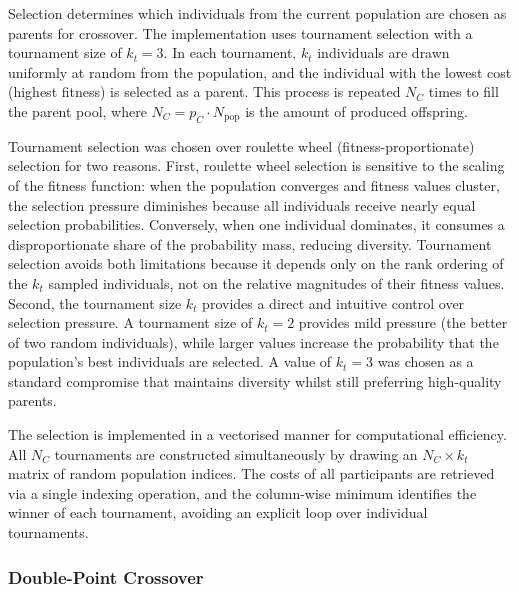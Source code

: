 Selection determines which individuals from the current population are chosen as parents for crossover. The implementation uses tournament selection with a tournament size of $k_t = 3$. In each tournament, $k_t$ individuals are drawn uniformly at random from the population, and the individual with the lowest cost (highest fitness) is selected as a parent. This process is repeated $N_C$ times to fill the parent pool, where $N_C = p_C \cdot N_{\text{pop}}$ is the amount of produced offspring.

Tournament selection was chosen over roulette wheel (fitness-proportionate) selection for two reasons. First, roulette wheel selection is sensitive to the scaling of the fitness function: when the population converges and fitness values cluster, the selection pressure diminishes because all individuals receive nearly equal selection probabilities. Conversely, when one individual dominates, it consumes a disproportionate share of the probability mass, reducing diversity. Tournament selection avoids both limitations because it depends only on the rank ordering of the $k_t$ sampled individuals, not on the relative magnitudes of their fitness values. Second, the tournament size $k_t$ provides a direct and intuitive control over selection pressure. A tournament size of $k_t = 2$ provides mild pressure (the better of two random individuals), while larger values increase the probability that the population's best individuals are selected. A value of $k_t = 3$ was chosen as a standard compromise that maintains diversity whilst still preferring high-quality parents.

The selection is implemented in a vectorised manner for computational efficiency. All $N_C$ tournaments are constructed simultaneously by drawing an $N_C \times k_t$ matrix of random population indices. The costs of all participants are retrieved via a single indexing operation, and the column-wise minimum identifies the winner of each tournament, avoiding an explicit loop over individual tournaments.

\subsubsection{Double-Point Crossover}
\label{sec:crossover}


